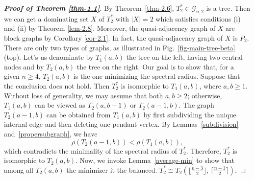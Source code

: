 \documentclass[12pt]{amsart}
\begin{document}
\begin{proof}[\bf{Proof of Theorem \ref{thm-1.1}}]
	By Theorem~\ref{thm-2.6}, $T_2^*\in \mathcal{G}_{n,2}$ is a tree. Then we can get a dominating set $X$ of $T_2^*$ with $|X|=2$ which satisfies conditions (i) and (ii) by Theorem \ref{lem-2.8}.
	Moreover,  the quasi-adjacency graph of $X$ are  block graphs by Corollary \ref{cor-2.1}.
	In fact, the quasi-adjacency graph of $X$ is $P_2$. There are only two types of graphs, as illustrated in Fig.~\ref{fig-main-tree-beta} (top). 
	Let's us denominate by $T_1(a,b)$ the tree on the left, having two central nodes and by $T_2(a,b)$ the tree on the right. 
	Our goal is to show that, for a given $n\geq 4$, $T_2(a,b)$ is the one minimizing the spectral radius. Suppose that the conclusion does not hold. 
	Then \(T_2^*\) is isomorphic to \(T_1(a,b)\), where \(a,b \ge 1\). 
Without loss of generality, we may assume that both \(a,b \ge 2\); otherwise, \(T_1(a,b)\) can be viewed as \(T_2(a,b-1)\) or \(T_2(a-1,b)\). 
The graph \(T_2(a-1,b)\) can be obtained from \(T_1(a,b)\) by first subdividing the unique internal edge and then deleting one pendant vertex. 
By Lemmas~\ref{subdivision} and~\ref{propersubgraph}, we have 
\[
\rho(T_2(a-1,b)) < \rho(T_1(a,b)),
\]
which contradicts the minimality of the spectral radius of \(T_2^*\).
Therefore, \( T_2^* \) is isomorphic to \( T_2(a,b) \). Now, we invoke  Lemma~\ref{average-min} to show that among all $T_2(a,b)$ the minimizer it the balanced.
\(
T_2^* \cong T_2\!\left(\lfloor \tfrac{n-3}{2} \rfloor,\, \lceil \tfrac{n-3}{2} \rceil\right).
\)
\end{proof}
\end{document}
